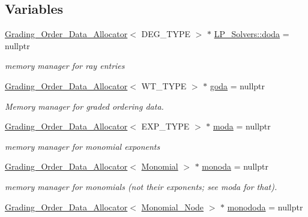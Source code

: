 \subsection*{Variables}
\begin{DoxyCompactItemize}
\item 
\hyperlink{group__memorygroup_class_grading___order___data___allocator}{Grading\+\_\+\+Order\+\_\+\+Data\+\_\+\+Allocator}$<$ D\+E\+G\+\_\+\+T\+Y\+PE $>$ $\ast$ \hyperlink{group__memorygroup_ga0dc763860167cb9a6e5c84bfda9a456e}{L\+P\+\_\+\+Solvers\+::doda} = nullptr
\begin{DoxyCompactList}\small\item\em memory manager for ray entries \end{DoxyCompactList}\item 
\hyperlink{group__memorygroup_class_grading___order___data___allocator}{Grading\+\_\+\+Order\+\_\+\+Data\+\_\+\+Allocator}$<$ W\+T\+\_\+\+T\+Y\+PE $>$ $\ast$ \hyperlink{group__memorygroup_gadf1bccf09eada41d10a5d4ceda7ca479}{goda} = nullptr
\begin{DoxyCompactList}\small\item\em Memory manager for graded ordering data. \end{DoxyCompactList}\item 
\hyperlink{group__memorygroup_class_grading___order___data___allocator}{Grading\+\_\+\+Order\+\_\+\+Data\+\_\+\+Allocator}$<$ E\+X\+P\+\_\+\+T\+Y\+PE $>$ $\ast$ \hyperlink{group__memorygroup_gaf2c367d23e09c5dad7e0273995a3304c}{moda} = nullptr
\begin{DoxyCompactList}\small\item\em memory manager for monomial exponents \end{DoxyCompactList}\item 
\hyperlink{group__memorygroup_class_grading___order___data___allocator}{Grading\+\_\+\+Order\+\_\+\+Data\+\_\+\+Allocator}$<$ \hyperlink{group__polygroup_class_monomial}{Monomial} $>$ $\ast$ \hyperlink{group__memorygroup_ga76b5ae808895658b417e3f3a13c60e51}{monoda} = nullptr
\begin{DoxyCompactList}\small\item\em memory manager for monomials (not their exponents; see moda for that). \end{DoxyCompactList}\item 
\hyperlink{group__memorygroup_class_grading___order___data___allocator}{Grading\+\_\+\+Order\+\_\+\+Data\+\_\+\+Allocator}$<$ \hyperlink{group__polygroup_class_monomial___node}{Monomial\+\_\+\+Node} $>$ $\ast$ \hyperlink{group__memorygroup_ga2b5eeb775f6c601e624b487f3245983a}{monododa} = nullptr

\end{DoxyCompactItemize}
